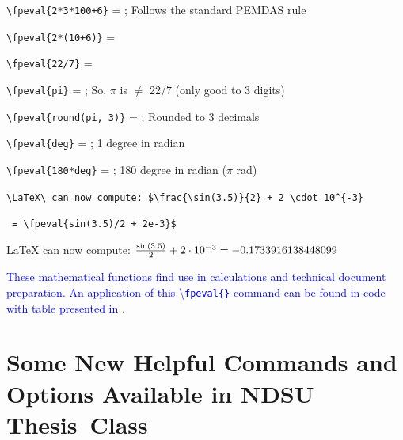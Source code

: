 \documentclass[phd,showgrids]{ndsu-thesis-2022}
\newcommand\italk[1]{\textcolor{blue}{#1}}  %
\newcommand\cmd[1]{\textbackslash\texttt{#1}}  %
\newcommand\lx{\LaTeX\xspace}
\begin{document}
\verb|\fpeval{2*3*100+6}| = ; \hspace{0.15in} Follows the standard PEMDAS rule

\verb|\fpeval{2*(10+6)}| = 
   
\verb|\fpeval{22/7}| = 

\verb|\fpeval{pi}| = ; \hspace{0.15in} So, $\pi$ is $\neq$ 22/7 (only good to 3 digits)

\verb|\fpeval{round(pi, 3)}| = ; \hspace{0.15in} Rounded to 3 decimals

\verb+\fpeval{deg}+ = ; \hspace{0.15in} 1 degree in radian

\verb+\fpeval{180*deg}+ = ; \hspace{0.15in} 180 degree in radian ($\pi$ rad)

\verb|\LaTeX\ can now compute: $\frac{\sin(3.5)}{2} + 2 \cdot 10^{-3}| 

\verb| = \fpeval{sin(3.5)/2 + 2e-3}$|

\lx can now compute: $\frac{\sin(3.5)}{2} + 2 \cdot 10^{-3} = \fpeval{sin(3.5)/2 + 2e-3}$

\italk{These mathematical functions find use in calculations and technical document preparation. An application of this \cmd{fpeval\{\}} command can be found in \Cref{tab210} code with table presented in \cpageref{tab210}}. 

\section{Some New Helpful Commands and Options Available in NDSU Thesis~Class}
\end{document}
